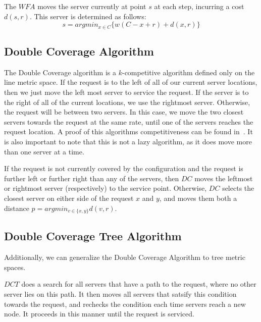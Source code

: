 \begin{definition}
    The $WFA$ moves the server currently at point $s$ at each step, incurring a cost $d(s,r)$. This server is determined as follows:
    \begin{equation*}
        s = argmin_{x \in C} \{ w(C-x+r) + d(x,r)\}
    \end{equation*}
\end{definition}

\subsection{Double Coverage Algorithm}
\label{sec:DC}
The Double Coverage algorithm is a $k$-competitive algorithm defined only on the line metric space. If the request is to the left of all of our current server locations, then we just move the left most server to service the request. If the server is to the right of all of the current locations, we use the rightmost server. Otherwise, the request will be between two servers. In this case, we move the two closest servers towards the request at the same rate, until one of the servers reaches the request location. A proof of this algorithms competitiveness can be found in~\cite{OnlineComp1998}. It is also important to note that this is not a lazy algorithm, as it does move more than one server at a time. 

\begin{definition}
    If the request is not currently covered by the configuration and the request is further left or further right than any of the servers, then $DC$ moves the leftmost or rightmost server (respectively) to the service point. Otherwise, $DC$ selects the closest server on either side of the request $x$ and $y$, and moves them both a distance $p = argmin_{v \in \{x, y\}} d(v, r)$.
\end{definition}

\subsection{Double Coverage Tree Algorithm}
Additionally, we can generalize the Double Coverage Algorithm to tree metric spaces. 

\begin{definition}
    $DCT$ does a search for all servers that have a path to the request, where no other server lies on this path. It then moves all servers that satsify this condition towards the request, and rechecks the condition each time servers reach a new node. It proceeds in this manner until the request is serviced.
\end{definition}

